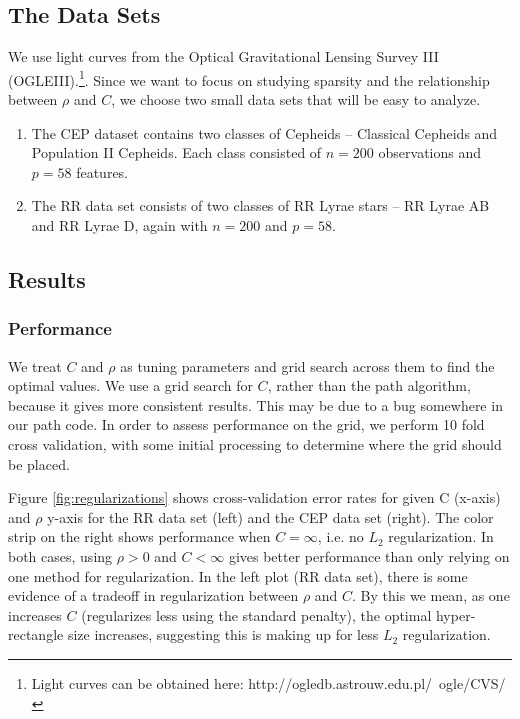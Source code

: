 \documentclass[10pt]{article}
\theoremstyle{definition}
\begin{document}
\subsection{The Data Sets}
We use light curves from the Optical Gravitational Lensing Survey III (OGLEIII).\footnote{Light curves can be obtained here: http://ogledb.astrouw.edu.pl/~ogle/CVS/}. Since we want to focus on studying sparsity and the relationship between $\rho$ and $C$, we choose two small data sets that will be easy to analyze.
\begin{enumerate}
\item The CEP dataset contains two classes of Cepheids --  Classical Cepheids and Population II Cepheids.  Each class consisted of $n=200$ observations and $p=58$ features.
\item The RR data set consists of two classes of RR Lyrae stars -- RR Lyrae AB and RR Lyrae D, again with $n=200$ and $p=58$.
\end{enumerate}

\subsection{Results}

\subsubsection{Performance}
We treat $C$ and $\rho$ as tuning parameters and grid search across them to find the optimal values. We use a grid search for $C$, rather than the path algorithm, because it gives more consistent results. This may be due to a bug somewhere in our path code. In order to assess performance on the grid, we perform 10 fold cross validation, with some initial processing to determine where the grid should be placed.

Figure \ref{fig:regularizations} shows cross-validation error rates for given C (x-axis) and $\rho$ y-axis for the RR data set (left) and the CEP data set (right). The color strip on the right shows performance when $C=\infty$, i.e. no $L_2$ regularization. In both cases, using $\rho>0$ and $C < \infty$ gives better performance than only relying on one method for regularization. In the left plot (RR data set), there is some evidence of a tradeoff in regularization between $\rho$ and $C$. By this we mean, as one increases $C$ (regularizes less using the standard penalty), the optimal hyper-rectangle size increases, suggesting this is making up for less $L_2$ regularization.
\end{document}
